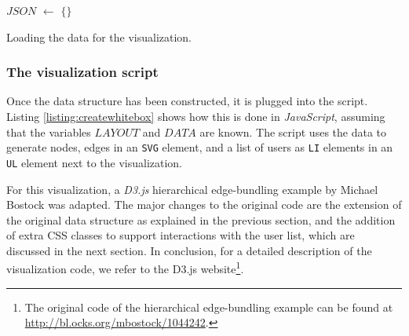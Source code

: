 \begin{algorithm}[H]
	{
		\SetAlgoLined
		$JSON$ $\leftarrow$ $\{\}$ \;
		}
	\caption{Loading the data for the visualization.}
	\label{alg:createjson}
\end{algorithm}


\subsubsection{The visualization script}

Once the data structure has been constructed, it is plugged into the script. Listing \ref{listing:createwhitebox} shows how this is done in \emph{JavaScript}, assuming that the variables $LAYOUT$ and $DATA$ are known. The script uses the data to generate nodes, edges in an \texttt{SVG} element, and a list of users as \texttt{LI} elements in an \texttt{UL} element next to the visualization.

For this visualization, a \emph{D3.js} hierarchical edge-bundling example by Michael Bostock\cite{bostock:2012:edgebundling} was adapted. The major changes to the original code are the extension of the original data structure as explained in the previous section, and the addition of extra CSS classes to support interactions with the user list, which are discussed in the next section. In conclusion, for a detailed description of the visualization code, we refer to the D3.js website\footnote{The original code of the hierarchical edge-bundling example can be found at \url{http://bl.ocks.org/mbostock/1044242}.}.


